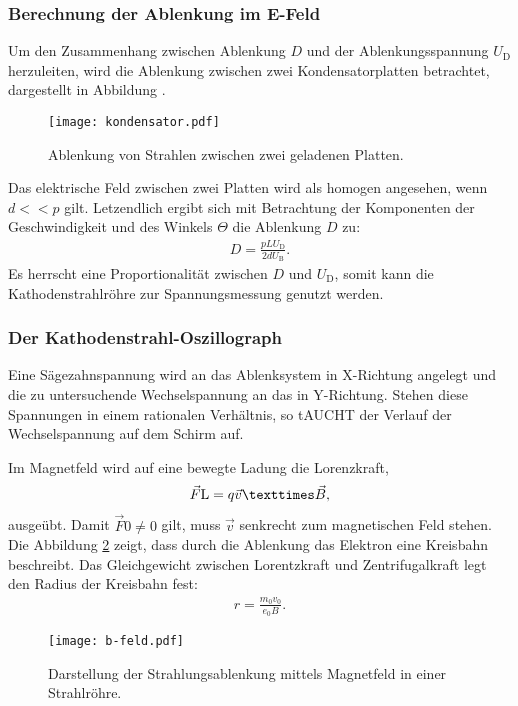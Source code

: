 \subsubsection{Berechnung der Ablenkung im E-Feld}
Um den Zusammenhang zwischen Ablenkung $D$ und der Ablenkungsspannung
$U_\mathrm{D}$ herzuleiten, wird die Ablenkung zwischen zwei
Kondensatorplatten betrachtet, dargestellt in Abbildung \label{fig:platte}.
\begin{figure}
 \centering
 \texttt{[image: kondensator.pdf]}
 \caption{Ablenkung von Strahlen zwischen zwei geladenen Platten.}
 \label{fig:kondensator}
\end{figure}
Das elektrische Feld zwischen zwei Platten wird als homogen angesehen, wenn
$d<<p$ gilt.
Letzendlich ergibt sich mit Betrachtung der Komponenten der Geschwindigkeit
und des Winkels $\Theta$ die Ablenkung $D$ zu:
\begin{align}
 D=\frac{pLU_\mathrm{D}}{2dU_\mathrm{B}}.
\end{align}
Es herrscht eine Proportionalität zwischen $D$ und $U_\mathrm{D}$,
somit kann die Kathodenstrahlröhre zur Spannungsmessung genutzt werden.

\subsubsection{Der Kathodenstrahl-Oszillograph}
Eine Sägezahnspannung wird an das Ablenksystem in X-Richtung angelegt und die zu untersuchende Wechselspannung an das in Y-Richtung.
Stehen diese Spannungen in einem rationalen Verhältnis, so tAUCHT der Verlauf der Wechselspannung auf dem Schirm auf.

Im Magnetfeld wird auf eine bewegte Ladung die Lorenzkraft,
\begin{align}
\vec{F}\mathrm{L}=q\vec{v}\texttimes\vec{B},
\end{align}
ausgeübt. Damit $\vec{F}\mathrm{0} \neq 0 $ gilt, muss $\vec{v}$ senkrecht zum magnetischen Feld stehen.
Die Abbildung \ref{fig:kreis} zeigt, dass durch die Ablenkung das Elektron eine Kreisbahn beschreibt. Das Gleichgewicht zwischen Lorentzkraft und Zentrifugalkraft legt den
Radius der Kreisbahn fest:
\begin{align}
  r=\frac{m_\mathrm{0}v_\mathrm{0}}{e_\mathrm{0}B}\label{eqn:radius}.
\end{align}

\begin{figure}
 \centering
 \texttt{[image: b-feld.pdf]}
 \caption{Darstellung der Strahlungsablenkung mittels Magnetfeld in einer Strahlröhre.}
 \label{fig:kreis}
\end{figure}

